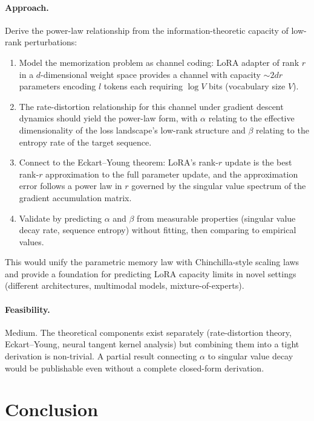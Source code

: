 \documentclass[11pt,a4paper]{article}
\begin{document}
\paragraph{Approach.} Derive the power-law relationship from the information-theoretic capacity of low-rank perturbations:
\begin{enumerate}
\item Model the memorization problem as channel coding: LoRA adapter of rank $r$ in a $d$-dimensional weight space provides a channel with capacity $\sim 2dr$ parameters encoding $l$ tokens each requiring $\log V$ bits (vocabulary size $V$).
\item The rate-distortion relationship for this channel under gradient descent dynamics should yield the power-law form, with $\alpha$ relating to the effective dimensionality of the loss landscape's low-rank structure and $\beta$ relating to the entropy rate of the target sequence.
\item Connect to the Eckart--Young theorem: LoRA's rank-$r$ update is the best rank-$r$ approximation to the full parameter update, and the approximation error follows a power law in $r$ governed by the singular value spectrum of the gradient accumulation matrix.
\item Validate by predicting $\alpha$ and $\beta$ from measurable properties (singular value decay rate, sequence entropy) without fitting, then comparing to empirical values.
\end{enumerate}
This would unify the parametric memory law with Chinchilla-style scaling laws~\cite{hoffmann2022training} and provide a foundation for predicting LoRA capacity limits in novel settings (different architectures, multimodal models, mixture-of-experts).

\paragraph{Feasibility.} Medium. The theoretical components exist separately (rate-distortion theory, Eckart--Young, neural tangent kernel analysis) but combining them into a tight derivation is non-trivial. A partial result connecting $\alpha$ to singular value decay would be publishable even without a complete closed-form derivation.

\section{Conclusion}
\end{document}
